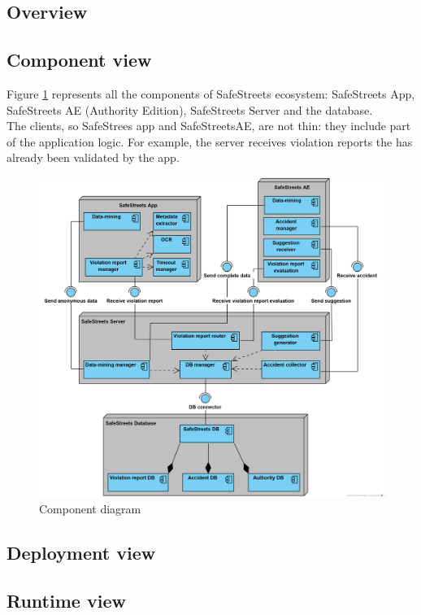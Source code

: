 \documentclass{article}
\begin{document}
		\subsection{Overview}
		\newpage
		\subsection{Component view}
		Figure \ref{fig:component_diagram} represents all the components of SafeStreets ecosystem: SafeStreets App, SafeStreets AE (Authority Edition), SafeStreets Server and the database.\\
		The clients, so SafeStrees app and SafeStreetsAE, are not thin: they include part of the application logic. For example, the server receives violation reports the has already been validated by the app.
		\begin{figure}[H]
			\includegraphics [scale=0.65] {diagrams/component_diagram.png}
			\caption[Component diagram]{Component diagram}
			\label{fig:component_diagram}
		\end{figure}
		
		\subsection{Deployment	view}
		\subsection{Runtime	view}
\end{document}
